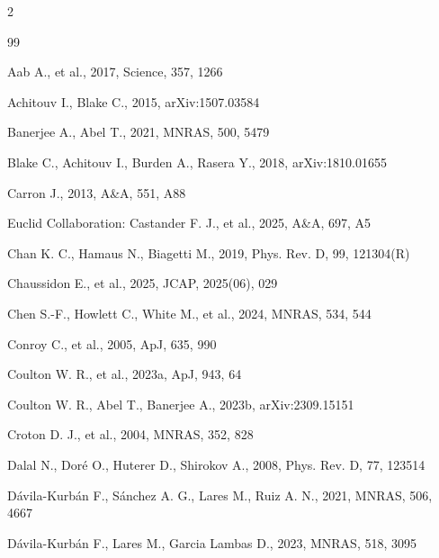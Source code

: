 \documentclass[11pt,a4paper]{article}
\begin{document}
\renewcommand{\refname}{\large References}
\begin{multicols}{2}
\begin{thebibliography}{99}
\scriptsize

Aab A., et al., 2017, Science, 357, 1266

Achitouv I., Blake C., 2015, arXiv:1507.03584

Banerjee A., Abel T., 2021, MNRAS, 500, 5479

Blake C., Achitouv I., Burden A., Rasera Y., 2018, arXiv:1810.01655

Carron J., 2013, A\&A, 551, A88

Euclid Collaboration: Castander F. J., et al., 2025, A\&A, 697, A5

Chan K. C., Hamaus N., Biagetti M., 2019, Phys. Rev. D, 99, 121304(R)

Chaussidon E., et al., 2025, JCAP, 2025(06), 029

Chen S.-F., Howlett C., White M., et al., 2024, MNRAS, 534, 544

Conroy C., et al., 2005, ApJ, 635, 990

Coulton W. R., et al., 2023a, ApJ, 943, 64

Coulton W. R., Abel T., Banerjee A., 2023b, arXiv:2309.15151

Croton D. J., et al., 2004, MNRAS, 352, 828

Dalal N., Dor\'e O., Huterer D., Shirokov A., 2008, Phys. Rev. D, 77, 123514

D\'avila-Kurb\'an F., S\'anchez A. G., Lares M., Ruiz A. N., 2021, MNRAS, 506, 4667

D\'avila-Kurb\'an F., Lares M., Garcia Lambas D., 2023, MNRAS, 518, 3095


\end{thebibliography}
\end{multicols}
\end{document}
